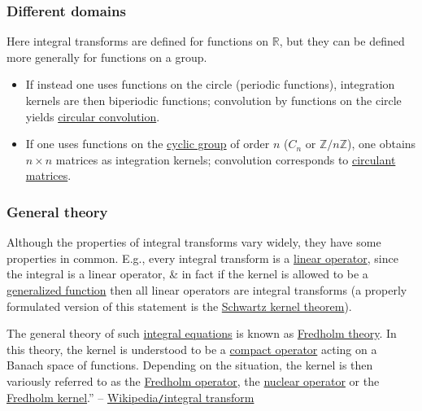 \documentclass{article}
\begin{document}
\subsubsection{Different domains}
Here integral transforms are defined for functions on $\mathbb{R}$, but they can be defined more generally for functions on a group.
\begin{itemize}
	\item If instead one uses functions on the circle (periodic functions), integration kernels are then biperiodic functions; convolution by functions on the circle yields \href{https://en.wikipedia.org/wiki/Circular_convolution}{circular convolution}.
	\item If one uses functions on the \href{https://en.wikipedia.org/wiki/Cyclic_group}{cyclic group} of order $n$ ($C_n$ or $\mathbb{Z}/n\mathbb{Z}$), one obtains $n\times n$ matrices as integration kernels; convolution corresponds to \href{https://en.wikipedia.org/wiki/Circulant_matrices}{circulant matrices}.
\end{itemize}

\subsubsection{General theory}
Although the properties of integral transforms vary widely, they have some properties in common. E.g., every integral transform is a \href{https://en.wikipedia.org/wiki/Linear_operator}{linear operator}, since the integral is a linear operator, \& in fact if the kernel is allowed to be a \href{https://en.wikipedia.org/wiki/Generalized_function}{generalized function} then all linear operators are integral transforms (a properly formulated version of this statement is the \href{https://en.wikipedia.org/wiki/Schwartz_kernel_theorem}{Schwartz kernel theorem}).

The general theory of such \href{https://en.wikipedia.org/wiki/Integral_equation}{integral equations} is known as \href{https://en.wikipedia.org/wiki/Fredholm_theory}{Fredholm theory}. In this theory, the kernel is understood to be a \href{https://en.wikipedia.org/wiki/Compact_operator}{compact operator} acting on a Banach space of functions. Depending on the situation, the kernel is then variously referred to as the \href{https://en.wikipedia.org/wiki/Fredholm_operator}{Fredholm operator}, the \href{https://en.wikipedia.org/wiki/Nuclear_operator}{nuclear operator} or the \href{https://en.wikipedia.org/wiki/Fredholm_kernel}{Fredholm kernel}.'' -- \href{https://en.wikipedia.org/wiki/Integral_transform}{Wikipedia{\tt/}integral transform}
\end{document}
